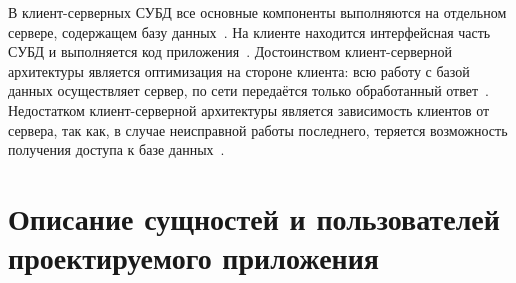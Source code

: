В клиент-серверных СУБД все основные компоненты выполняются на отдельном сервере, содержащем базу данных~\cite{dbmsu}.
На клиенте находится интерфейсная часть СУБД и выполняется код приложения~\cite{dbmsu}.
Достоинством клиент-серверной архитектуры является оптимизация на стороне клиента: всю работу с базой данных осуществляет сервер, по сети передаётся только обработанный ответ~\cite{dbmsu}.
Недостатком клиент-серверной архитектуры является зависимость клиентов от сервера, так как, в случае неисправной работы последнего, теряется возможность получения доступа к базе данных~\cite{dbmsu}.



\section[Описание сущностей и пользователей проектируемого приложения]{Описание сущностей и пользователей\\проектируемого приложения}

\clearpage
